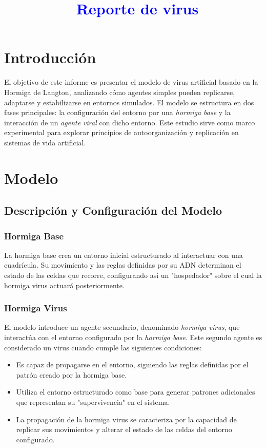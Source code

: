 \documentclass[twocolumn]{article}
\newcommand{\todo}[1]{\textcolor{blue}{\ding{46}~#1}}
\begin{document}
\title{
	\todo{Reporte de virus}
}

\maketitle

\section{Introducción}
El objetivo de este informe es presentar el modelo de virus artificial basado en la Hormiga de Langton, analizando cómo agentes simples pueden replicarse, adaptarse y estabilizarse en entornos simulados. El modelo se estructura en dos fases principales: la configuración del entorno por una \textit{hormiga base} y la interacción de un \textit{agente viral} con dicho entorno. Este estudio sirve como marco experimental para explorar principios de autoorganización y replicación en sistemas de vida artificial.

\section{Modelo}\label{sec:related}

\subsection{Descripción y Configuración del Modelo}

\subsubsection{Hormiga Base}
La hormiga base crea un entorno inicial estructurado al interactuar con una cuadrícula. Su movimiento y las reglas definidas por su ADN determinan el estado de las celdas que recorre, configurando así un "hospedador" sobre el cual la hormiga virus actuará posteriormente.

\subsubsection{Hormiga Virus}
El modelo introduce un agente secundario, denominado \textit{hormiga virus}, que interactúa con el entorno configurado por la \textit{hormiga base}. Este segundo agente es considerado un virus cuando cumple las siguientes condiciones:

\begin{itemize}
    \item Es capaz de propagarse en el entorno, siguiendo las reglas definidas por el patrón creado por la hormiga base.
    \item Utiliza el entorno estructurado como base para generar patrones adicionales que representan su "supervivencia" en el sistema.
    \item La propagación de la hormiga virus se caracteriza por la capacidad de replicar sus movimientos y alterar el estado de las celdas del entorno configurado.
\end{itemize}
\end{document}
